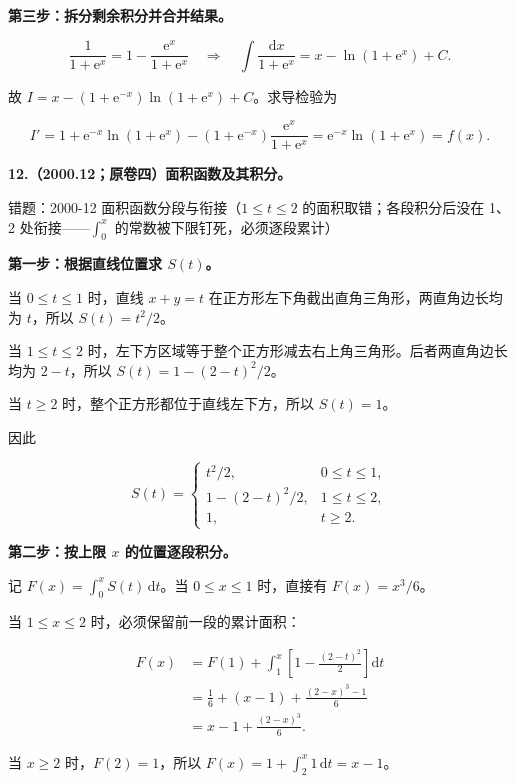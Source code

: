 \documentclass[UTF8,11pt,fontset=windows]{ctexart}
\begin{document}
\textbf{第三步：拆分剩余积分并合并结果。}

$$
\frac1{1+\mathrm e^x}=1-\frac{\mathrm e^x}{1+\mathrm e^x}
\quad\Longrightarrow\quad
\int\frac{\mathrm dx}{1+\mathrm e^x}=x-\ln(1+\mathrm e^x)+C.
$$

故 $\boxed{I=x-(1+\mathrm e^{-x})\ln(1+\mathrm e^x)+C}$。求导检验为

$$
I'=1+\mathrm e^{-x}\ln(1+\mathrm e^x)
 -(1+\mathrm e^{-x})\frac{\mathrm e^x}{1+\mathrm e^x}
=\mathrm e^{-x}\ln(1+\mathrm e^x)=f(x).
$$

\clearpage

\textbf{12.（2000.12；原卷四）面积函数及其积分。}

\begingroup\color{gray}错题：2000-12 面积函数分段与衔接（$1\le t\le2$ 的面积取错；各段积分后没在 1、2 处衔接——$\int_0^x$ 的常数被下限钉死，必须逐段累计）\par\endgroup

\textbf{第一步：根据直线位置求 $S(t)$。}

当 $0\le t\le1$ 时，直线 $x+y=t$ 在正方形左下角截出直角三角形，两直角边长均为 $t$，所以 $S(t)=t^2/2$。

当 $1\le t\le2$ 时，左下方区域等于整个正方形减去右上角三角形。后者两直角边长均为 $2-t$，所以 $S(t)=1-(2-t)^2/2$。

当 $t\ge2$ 时，整个正方形都位于直线左下方，所以 $S(t)=1$。

因此

$$
S(t)=\begin{cases}
t^2/2,&0\le t\le1,\\
1-(2-t)^2/2,&1\le t\le2,\\
1,&t\ge2.
\end{cases}
$$

\textbf{第二步：按上限 $x$ 的位置逐段积分。}

记 $F(x)=\int_0^xS(t)\,\mathrm dt$。当 $0\le x\le1$ 时，直接有 $F(x)=x^3/6$。

当 $1\le x\le2$ 时，必须保留前一段的累计面积：

$$
\begin{aligned}
F(x)&=F(1)+\int_1^x\left[1-\frac{(2-t)^2}{2}\right]\mathrm dt\\
&=\frac16+(x-1)+\frac{(2-x)^3-1}{6}\\
&=x-1+\frac{(2-x)^3}{6}.
\end{aligned}
$$

当 $x\ge2$ 时，$F(2)=1$，所以 $F(x)=1+\int_2^x1\,\mathrm dt=x-1$。
\end{document}
